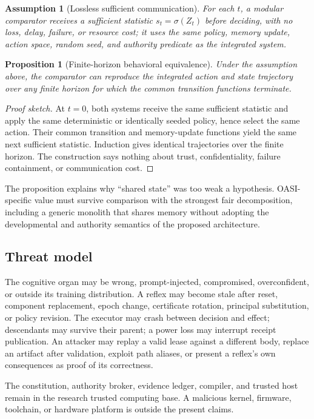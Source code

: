 \documentclass[journal,10pt]{IEEEtran}
\newcommand{\OASI}{\textsc{OASI}}
\newtheorem{proposition}{Proposition}
\newtheorem{assumption}{Assumption}
\begin{document}
\begin{assumption}[Lossless sufficient communication]
For each $t$, a modular comparator receives a sufficient statistic $s_t=\sigma(Z_t)$ before deciding, with no loss, delay, failure, or resource cost; it uses the same policy, memory update, action space, random seed, and authority predicate as the integrated system.
\end{assumption}

\begin{proposition}[Finite-horizon behavioral equivalence]
Under the assumption above, the comparator can reproduce the integrated action and state trajectory over any finite horizon for which the common transition functions terminate.
\end{proposition}

\begin{proof}[Proof sketch]
At $t=0$, both systems receive the same sufficient statistic and apply the same deterministic or identically seeded policy, hence select the same action. Their common transition and memory-update functions yield the same next sufficient statistic. Induction gives identical trajectories over the finite horizon. The construction says nothing about trust, confidentiality, failure containment, or communication cost.
\end{proof}

The proposition explains why ``shared state'' was too weak a hypothesis. \OASI{}-specific value must survive comparison with the strongest fair decomposition, including a generic monolith that shares memory without adopting the developmental and authority semantics of the proposed architecture.

\subsection{Threat model}
The cognitive organ may be wrong, prompt-injected, compromised, overconfident, or outside its training distribution. A reflex may become stale after reset, component replacement, epoch change, certificate rotation, principal substitution, or policy revision. The executor may crash between decision and effect; descendants may survive their parent; a power loss may interrupt receipt publication. An attacker may replay a valid lease against a different body, replace an artifact after validation, exploit path aliases, or present a reflex's own consequences as proof of its correctness.

The constitution, authority broker, evidence ledger, compiler, and trusted host remain in the research trusted computing base. A malicious kernel, firmware, toolchain, or hardware platform is outside the present claims.
\end{document}
